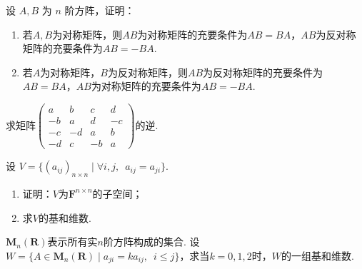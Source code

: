 \begin{exercise}
\begin{exgroup}
\begin{answer}
        \end{answer}

        \item 设 $A, B$ 为 $n$ 阶方阵，证明：
        \begin{enumerate}
            \item 若$A,B$为对称矩阵，则$AB$为对称矩阵的充要条件为$AB=BA$，$AB$为反对称矩阵的充要条件为$AB=-BA$.
            \item 若$A$为对称矩阵，$B$为反对称矩阵，则$AB$为反对称矩阵的充要条件为$AB=BA$，$AB$为对称矩阵的充要条件为$AB=-BA$.
        \end{enumerate}
        \begin{answer}

        \end{answer}

        \item 求矩阵$\begin{pmatrix}
                a  & b  & c  & d  \\
                -b & a  & d  & -c \\
                -c & -d & a  & b  \\
                -d & c  & -b & a
            \end{pmatrix}$的逆.
            \begin{answer}

            \end{answer}

        \item 设 $V=\{(a_{ij})_{n \times n} \mid \forall i,j,\enspace a_{ij}=a_{ji}\}$.
        \begin{enumerate}
            \item 证明：$V$为$\mathbf{F}^{n \times n}$的子空间；

            \item 求$V$的基和维数.
        \end{enumerate}
        \begin{answer}

        \end{answer}

        \item $\mathbf{M}_n(\mathbf{R})$表示所有实$n$阶方阵构成的集合. 设$W=\{A\in \mathbf{M}_n(\mathbf{R}) \mid a_{ji}=ka_{ij},\enspace i \leqslant j\}$，求当$k=0,1,2$时，$W$的一组基和维数.
        \begin{answer}

        \end{answer}


\end{exgroup}
\end{exercise}

